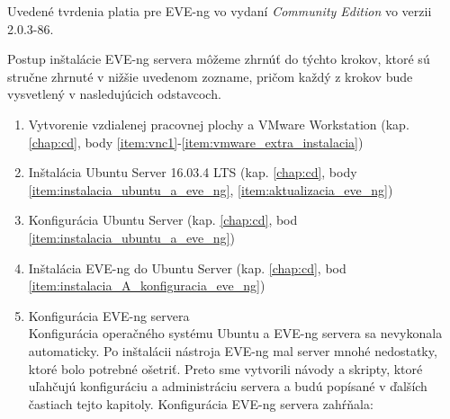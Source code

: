 \noindent
Uvedené tvrdenia platia pre EVE-ng vo vydaní \emph{Community Edition} vo verzii 2.0.3-86.

\noindent
Postup inštalácie EVE-ng servera môžeme zhrnúť do týchto krokov, ktoré sú stručne zhrnuté v nižšie uvedenom zozname, pričom každý z krokov bude vysvetlený v nasledujúcich odstavcoch.
\begin{enumerate}[noitemsep]
    \item \label{item:vzdialena_pracovna_plocha} Vytvorenie vzdialenej pracovnej plochy a VMware Workstation (kap. \ref{chap:cd}, body \ref{item:vnc1}-\ref{item:vmware_extra_instalacia})
    \item \label{item:ubuntu_install} Inštalácia Ubuntu Server 16.03.4 LTS (kap. \ref{chap:cd}, body \ref{item:instalacia_ubuntu_a_eve_ng}, \ref{item:aktualizacia_eve_ng})
    \item \label{item:ubuntu_config} Konfigurácia Ubuntu Server (kap. \ref{chap:cd}, bod \ref{item:instalacia_ubuntu_a_eve_ng})
    \item \label{item:eve_ng_install_on_ubuntu} Inštalácia EVE-ng do Ubuntu Server (kap. \ref{chap:cd}, bod \ref{item:instalacia_A_konfiguracia_eve_ng})
    \item Konfigurácia EVE-ng servera\\

\noindent
Konfigurácia operačného systému Ubuntu a EVE-ng servera sa nevykonala automaticky. Po inštalácii nástroja EVE-ng mal server mnohé nedostatky, ktoré bolo potrebné ošetriť. Preto sme vytvorili návody a skripty, ktoré uľahčujú konfiguráciu a administráciu servera a budú popísané v ďalších častiach tejto kapitoly. Konfigurácia EVE-ng servera zahŕňala:



\end{enumerate}
